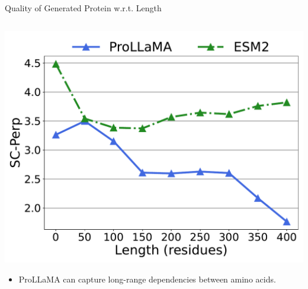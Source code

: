 \begin{frame}{Quality of Generated Protein w.r.t. Length}
\begin{columns}
\begin{column}{0.5\textwidth}
		\includegraphics[scale=0.23]{images/combined_length_scperp_zhexiantu.pdf}
		\begin{itemize}
			\item ProLLaMA can capture long-range dependencies between amino acids.
		\end{itemize}
	\end{column}
\end{columns}
\vspace{-2em}
\end{frame}